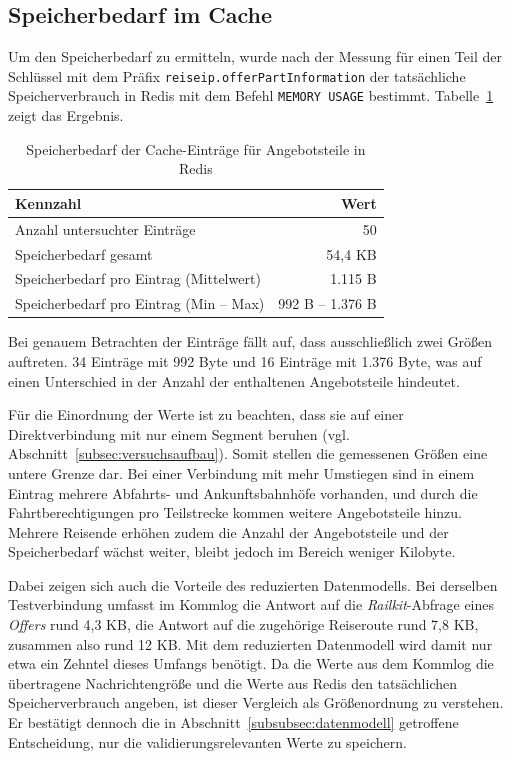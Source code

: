 \subsection{Speicherbedarf im Cache}
\label{subsec:speicherbedarf}

Um den Speicherbedarf zu ermitteln, wurde nach der Messung für einen Teil der Schlüssel mit dem Präfix \texttt{reiseip.offerPartInformation} der tatsächliche Speicherverbrauch in Redis mit dem Befehl \texttt{MEMORY USAGE} bestimmt. Tabelle~\ref{tab:speicherbedarf} zeigt das Ergebnis.

\begin{table}[htbp]
    \centering
    \begin{tabular}{l r}
        \hline
        \textbf{Kennzahl} & \textbf{Wert} \\
        \hline
        Anzahl untersuchter Einträge & 50 \\
        Speicherbedarf gesamt & 54,4 KB \\
        Speicherbedarf pro Eintrag (Mittelwert) & 1.115 B \\
        Speicherbedarf pro Eintrag (Min -- Max) & 992 B -- 1.376 B \\
        \hline
    \end{tabular}
    \caption{Speicherbedarf der Cache-Einträge für Angebotsteile in Redis}
    \label{tab:speicherbedarf}
\end{table}

Bei genauem Betrachten der Einträge fällt auf, dass ausschließlich zwei Größen auftreten. 34 Einträge mit 992 Byte und 16 Einträge mit 1.376 Byte, was auf einen Unterschied in der Anzahl der enthaltenen Angebotsteile hindeutet.

Für die Einordnung der Werte ist zu beachten, dass sie auf einer Direktverbindung mit nur einem Segment beruhen (vgl. Abschnitt~\ref{subsec:versuchsaufbau}). Somit stellen die gemessenen Größen eine untere Grenze dar. Bei einer Verbindung mit mehr Umstiegen sind in einem Eintrag mehrere Abfahrts- und Ankunftsbahnhöfe vorhanden, und durch die Fahrtberechtigungen pro Teilstrecke kommen weitere Angebotsteile hinzu. Mehrere Reisende erhöhen zudem die Anzahl der Angebotsteile und der Speicherbedarf wächst weiter, bleibt jedoch im Bereich weniger Kilobyte.

Dabei zeigen sich auch die Vorteile des reduzierten Datenmodells. Bei derselben Testverbindung umfasst im Kommlog die Antwort auf die \textit{Railkit}-Abfrage eines \textit{Offers} rund 4,3 KB, die Antwort auf die zugehörige Reiseroute rund 7,8 KB, zusammen also rund 12 KB. Mit dem reduzierten Datenmodell wird damit nur etwa ein Zehntel dieses Umfangs benötigt. Da die Werte aus dem Kommlog die übertragene Nachrichtengröße und die Werte aus Redis den tatsächlichen Speicherverbrauch angeben, ist dieser Vergleich als Größenordnung zu verstehen. Er bestätigt dennoch die in Abschnitt~\ref{subsubsec:datenmodell} getroffene Entscheidung, nur die validierungsrelevanten Werte zu speichern.

